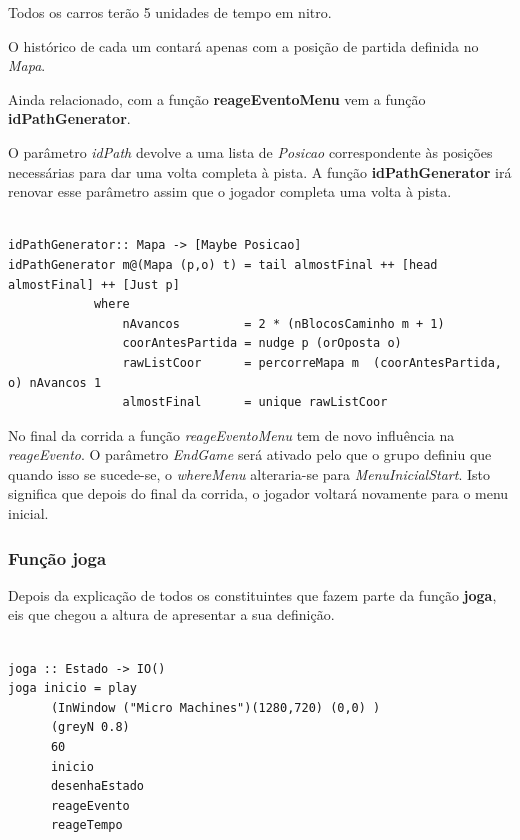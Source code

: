 \documentclass[a4paper]{report} %
\begin{document}
Todos os carros terão 5 unidades de tempo em nitro. 

O histórico de cada um contará apenas com a posição de partida definida no \emph{Mapa}.

Ainda relacionado, com a função \textbf{reageEventoMenu} vem a função \textbf{idPathGenerator}.

O parâmetro \emph{idPath} devolve a uma lista de \emph{Posicao} correspondente às posições necessárias para dar uma volta completa à pista. A função \textbf{idPathGenerator} irá renovar esse parâmetro assim que o jogador completa uma volta à pista.

\scriptsize

\begin{verbatim}

idPathGenerator:: Mapa -> [Maybe Posicao]
idPathGenerator m@(Mapa (p,o) t) = tail almostFinal ++ [head almostFinal] ++ [Just p]
            where
                nAvancos         = 2 * (nBlocosCaminho m + 1)
                coorAntesPartida = nudge p (orOposta o)
                rawListCoor      = percorreMapa m  (coorAntesPartida, o) nAvancos 1
                almostFinal      = unique rawListCoor
\end{verbatim}


\normalsize

No final da corrida a função \emph{reageEventoMenu} tem de novo influência na \emph{reageEvento}. O parâmetro \emph{EndGame} será ativado pelo que o grupo definiu que quando isso se sucede-se, o \emph{whereMenu} alteraria-se para \emph{MenuInicialStart}. Isto significa que depois do final da corrida, o jogador voltará novamente para o menu inicial.

\subsubsection{Função \textbf{joga}}

Depois da explicação de todos os constituintes que fazem parte da função \textbf{joga}, eis que chegou a altura de apresentar a sua definição.

\begin{verbatim}

joga :: Estado -> IO()
joga inicio = play
      (InWindow ("Micro Machines")(1280,720) (0,0) )     
      (greyN 0.8)                                                  
      60                                                           
      inicio                                                        
      desenhaEstado                                                 
      reageEvento                                                  
      reageTempo

\end{verbatim}
\end{document}
